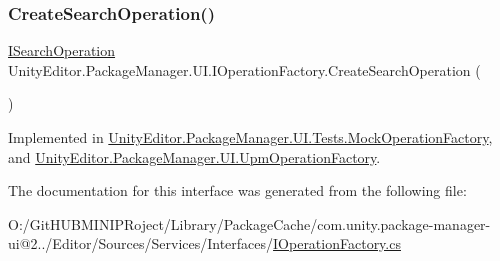 \mbox{\label{interface_unity_editor_1_1_package_manager_1_1_u_i_1_1_i_operation_factory_a1e4b0e667c493749785f3444697e59ce}} 
\subsubsection{\texorpdfstring{CreateSearchOperation()}{CreateSearchOperation()}}
{\footnotesize\ttfamily \mbox{\hyperlink{interface_unity_editor_1_1_package_manager_1_1_u_i_1_1_i_search_operation}{I\+Search\+Operation}} Unity\+Editor.\+Package\+Manager.\+U\+I.\+I\+Operation\+Factory.\+Create\+Search\+Operation (\begin{DoxyParamCaption}{ }\end{DoxyParamCaption})}



Implemented in \mbox{\hyperlink{class_unity_editor_1_1_package_manager_1_1_u_i_1_1_tests_1_1_mock_operation_factory_ac6f6ae337cc8eafb8726dcf7b697cdbe}{Unity\+Editor.\+Package\+Manager.\+U\+I.\+Tests.\+Mock\+Operation\+Factory}}, and \mbox{\hyperlink{class_unity_editor_1_1_package_manager_1_1_u_i_1_1_upm_operation_factory_a49788149061bc550315ab55adb0a89d8}{Unity\+Editor.\+Package\+Manager.\+U\+I.\+Upm\+Operation\+Factory}}.



The documentation for this interface was generated from the following file\+:\begin{DoxyCompactItemize}
\item 
O\+:/\+Git\+H\+U\+B\+M\+I\+N\+I\+P\+Roject/\+Library/\+Package\+Cache/com.\+unity.\+package-\/manager-\/ui@2../\+Editor/\+Sources/\+Services/\+Interfaces/\mbox{\hyperlink{_i_operation_factory_8cs}{I\+Operation\+Factory.\+cs}}\end{DoxyCompactItemize}
